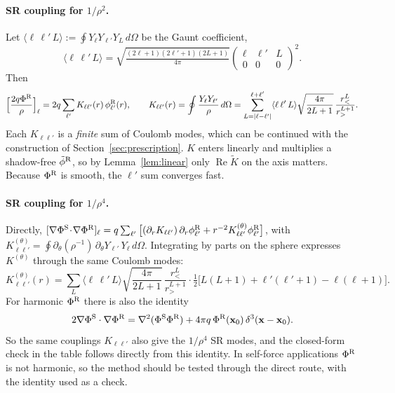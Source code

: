 \documentclass[11pt,a4paper]{article}
\renewcommand{\Re}{\operatorname{Re}}
\newcommand{\PhiS}{\Phi^{\rm S}}
\newcommand{\PhiR}{\Phi^{\rm R}}
\newcommand{\phiR}{\phi^{\rm R}}
\newcommand{\x}{\mathbf{x}}
\begin{document}
\paragraph{SR coupling for $1/\rho^2$.}
Let $\langle\ell\,\ell'\,L\rangle:=\oint Y_\ell Y_{\ell'}Y_L\,d\Omega$ be the Gaunt coefficient,
\[
\langle\ell\,\ell'\,L\rangle=\sqrt{\tfrac{(2\ell+1)(2\ell'+1)(2L+1)}{4\pi}}\begin{pmatrix}\ell&\ell'&L\\0&0&0\end{pmatrix}^{2}.
\]
Then
\begin{equation}
\Big[\frac{2q\PhiR}{\rho}\Big]_\ell=2q\sum_{\ell'}K_{\ell\ell'}(r)\,\phiR_{\ell'}(r),\qquad
K_{\ell\ell'}(r)=\oint\frac{Y_\ell Y_{\ell'}}{\rho}\,d\Omega=\sum_{L=|\ell-\ell'|}^{\ell+\ell'}\langle\ell\,\ell'\,L\rangle\sqrt{\frac{4\pi}{2L+1}}\,\frac{r_<^L}{r_>^{L+1}}.
\end{equation}
Each $K_{\ell\ell'}$ is a \emph{finite} sum of Coulomb modes, which can be continued with the construction of Section~\ref{sec:prescription}.
$K$ enters linearly and multiplies a shadow-free $\tilde\phi^{\rm R}$, so by Lemma~\ref{lem:linear} only $\Re\tilde K$ on the axis matters.
Because $\PhiR$ is smooth, the $\ell'$ sum converges fast.

\paragraph{SR coupling for $1/\rho^4$.}
Directly, $[\nabla\PhiS\!\cdot\!\nabla\PhiR]_\ell=q\sum_{\ell'}\big[(\partial_rK_{\ell\ell'})\,\partial_r\phiR_{\ell'}+r^{-2}K^{(\theta)}_{\ell\ell'}\phiR_{\ell'}\big]$, with $K^{(\theta)}_{\ell\ell'}=\oint\partial_\theta(\rho^{-1})\,\partial_\theta Y_{\ell'}\,Y_\ell\,d\Omega$.
Integrating by parts on the sphere expresses $K^{(\theta)}$ through the same Coulomb modes:
\begin{equation}
K^{(\theta)}_{\ell\ell'}(r)=\sum_{L}\langle\ell\,\ell'\,L\rangle\sqrt{\frac{4\pi}{2L+1}}\,\frac{r_<^L}{r_>^{L+1}}\cdot\tfrac12\big[L(L+1)+\ell'(\ell'+1)-\ell(\ell+1)\big].
\end{equation}
For harmonic $\PhiR$ there is also the identity
\begin{equation}
2\nabla\PhiS\cdot\nabla\PhiR=\nabla^2(\PhiS\PhiR)+4\pi q\,\PhiR(\x_0)\,\delta^3(\x-\x_0).
\end{equation}
So the same couplings $K_{\ell\ell'}$ also give the $1/\rho^4$ SR modes, and the closed-form check in the table follows directly from this identity.
In self-force applications $\PhiR$ is not harmonic, so the method should be tested through the direct route, with the identity used as a check.
\end{document}
